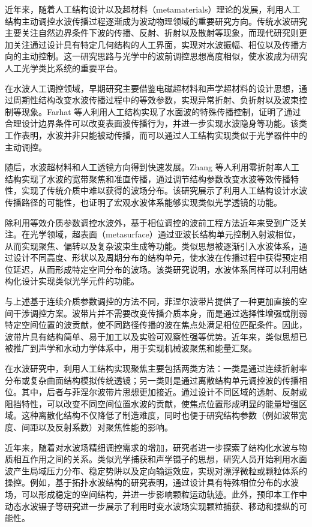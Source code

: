 \documentclass[11pt,a4paper]{ctexart}
\begin{document}
近年来，随着人工结构设计以及超材料（metamaterials）理论的发展，利用人工结构主动调控水波传播过程逐渐成为波动物理领域的重要研究方向。传统水波研究主要关注自然边界条件下波的传播、反射、折射以及散射等现象，而现代研究则更加关注通过设计具有特定几何结构的人工界面，实现对水波振幅、相位以及传播方向的主动控制。这一研究思路与光学中的波前调控思想高度相似，使水波成为研究人工光学类比系统的重要平台。

在水波人工调控领域，早期研究主要借鉴电磁超材料和声学超材料的设计思想，通过周期性结构改变水波传播过程中的等效参数，实现异常折射、负折射以及波束控制等现象。Farhat 等人利用人工结构实现了水面波的特殊传播控制，证明了通过合理设计边界条件可以改变表面波传播行为，并进一步实现水波隐身等功能\cite{Farhat2009}。该类工作表明，水波并非只能被动传播，而可以通过人工结构实现类似于光学器件中的主动调控。

随后，水波超材料和人工透镜方向得到快速发展。Zhang 等人利用零折射率人工结构实现了水波的宽带聚焦和准直传播，通过调节结构参数改变水波等效传播特性，实现了传统介质中难以获得的波场分布\cite{Zhang2014}。该研究展示了利用人工结构设计水波传播路径的可能性，也证明了宏观水波体系能够实现类似光学透镜的功能。

除利用等效介质参数调控水波外，基于相位调控的波前工程方法近年来受到广泛关注。在光学领域，超表面（metasurface）通过亚波长结构单元控制入射波相位，从而实现聚焦、偏转以及复杂波束生成等功能。类似思想被逐渐引入水波体系，通过设计不同高度、形状以及周期分布的结构单元，使水波在传播过程中获得预定相位延迟，从而形成特定空间分布的波场。该类研究说明，水波体系同样可以利用结构化设计实现类似光学元件的功能\cite{Che2024STVP}。

与上述基于连续介质参数调控的方法不同，菲涅尔波带片提供了一种更加直接的空间干涉调控方案。波带片并不需要改变传播介质本身，而是通过选择性增强或削弱特定空间位置的波贡献，使不同路径传播的波在焦点处满足相位匹配条件。因此，波带片具有结构简单、易于加工以及实验可观察性强等优势。近年来，类似思想已被推广到声学和水动力学体系中，用于实现机械波聚焦和能量汇聚。

在水波研究中，利用人工结构实现聚焦主要包括两类方法：一类是通过连续折射率分布或复杂曲面结构模拟传统透镜；另一类则是通过离散结构单元调控波的传播相位。其中，后者与菲涅尔波带片思想更加接近。通过设计不同区域的透射、反射或阻挡特性，可以改变不同空间位置水波的贡献，使焦点位置形成明显的能量增强区域。这种离散化结构不仅降低了制造难度，同时也便于研究结构参数（例如波带宽度、间距以及反射系数）对聚焦性能的影响。

近年来，随着对水波场精细调控需求的增加，研究者进一步探索了结构化水波与物质相互作用之间的关系。类似光学捕获和声学镊子的思想，研究人员开始利用水面波产生局域压力分布、稳定势阱以及定向输运效应，实现对漂浮微粒或颗粒体系的操控。例如，基于拓扑水波结构的研究表明，通过设计具有特殊相位分布的水波场，可以形成稳定的空间结构，并进一步影响颗粒运动轨迹\cite{Wang2024}。此外，预印本工作中动态水波镊子等研究进一步展示了利用时变水波场实现颗粒捕获、移动和操纵的可能性\cite{Wang2026}。
\end{document}
